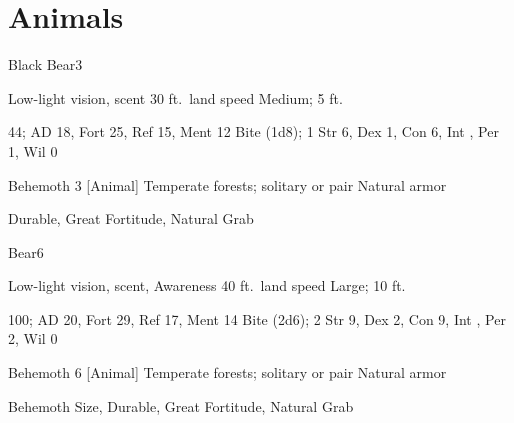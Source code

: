 \section{Animals}

    \begin{monsection}{Black Bear}{3}
        \begin{spellcontent}
            \begin{spelltargetinginfo}
                \pari {} Low-light vision, scent
                \pari {} 30 ft.\ land speed
                \pari {} Medium;  5 ft.
            \end{spelltargetinginfo}
            \begin{spelleffects}
                \pari {} 44;  AD 18, Fort 25, Ref 15, Ment 12
                \pari {} Bite  (1d8);  1
                \pari {} Str 6, Dex 1, Con 6, Int , Per 1, Wil 0
            \end{spelleffects}
        \end{spellcontent}
        \begin{spellfooter}
            \pari {} Behemoth 3 [Animal]
            \pari {} Temperate forests; solitary or pair
            \pari {} Natural armor 
        \end{spellfooter}
    \end{monsection}
     Durable, Great Fortitude, Natural Grab

    \begin{monsection}[Brown]{Bear}{6}
        \begin{spellcontent}
            \begin{spelltargetinginfo}
                \pari {} Low-light vision, scent, Awareness 
                \pari {} 40 ft.\ land speed
                \pari {} Large;  10 ft.
            \end{spelltargetinginfo}
            \begin{spelleffects}
                \pari {} 100;  AD 20, Fort 29, Ref 17, Ment 14
                \pari {} Bite  (2d6);  2
                \pari {} Str 9, Dex 2, Con 9, Int , Per 2, Wil 0
            \end{spelleffects}
        \end{spellcontent}
        \begin{spellfooter}
            \pari {} Behemoth 6 [Animal]
            \pari {} Temperate forests; solitary or pair
            \pari {} Natural armor 
        \end{spellfooter}
    \end{monsection}
     Behemoth Size, Durable, Great Fortitude, Natural Grab

